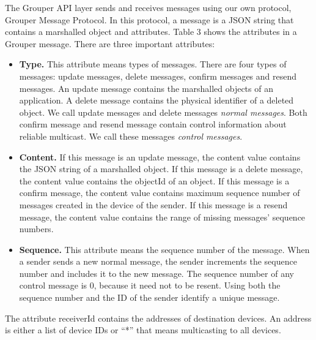 \documentclass[twocolumn,10pt]{article}
\begin{document}
The Grouper API layer sends and receives messages using our own protocol, Grouper Message Protocol.
In this protocol, a message is a JSON string that contains a marshalled object and attributes.
Table 3 shows the attributes in a Grouper message.
There are three important attributes:

\begin{itemize}
	\setlength{\itemsep}{1pt}
	\setlength{\parskip}{0pt}
	\setlength{\parsep}{0pt}
	\item \textbf{Type.}
	This attribute means types of messages.
	There are four types of messages: update messages, delete messages, confirm messages and resend messages.
	An update message contains the marshalled objects of an application.
	A delete message contains the physical identifier of a deleted object.
	We call update messages and delete messages \emph{normal messages}. 
	Both confirm message and resend message contain control information about reliable multicast. 
	We call these messages \emph{control messages}.
	\item \textbf{Content.} 
	If this message is an update message, the content value contains the JSON string of a marshalled object.
	If this message is a delete message, the content value contains the objectId of an object.
	If this message is a confirm message, the content value contains maximum sequence number of messages created in the device of the sender.
	If this message is a resend message, the content value contains the range of missing messages' sequence numbers.
	\item \textbf{Sequence.}
	This attribute means the sequence number of the message.
	When a sender sends a new normal message, the sender increments the sequence number and includes it to the new message.
	The sequence number of any control message is 0, because it need not to be resent.
	Using both the sequence number and the ID of the sender identify a unique message.
\end{itemize}

The attribute receiverId contains the addresses of destination devices.
An address is either a list of device IDs or ``*'' that means multicasting to all devices.
\end{document}
